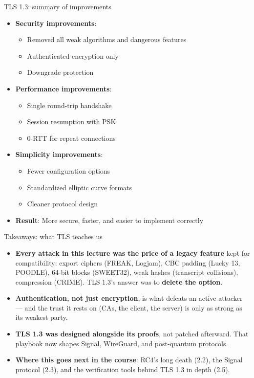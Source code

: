 \ifdefined\PRESENTATION\else\PassOptionsToClass{handout}{beamer}\fi\documentclass[aspectratio=169, lualatex]{beamer}
\begin{document}
\begin{frame}{TLS 1.3: summary of improvements}
	\begin{itemize}
		\item \textbf{Security improvements}:
		      \begin{itemize}
			      \item Removed all weak algorithms and dangerous features
			      \item Authenticated encryption only
			      \item Downgrade protection
		      \end{itemize}
		\item \textbf{Performance improvements}:
		      \begin{itemize}
			      \item Single round-trip handshake
			      \item Session resumption with PSK
			      \item 0-RTT for repeat connections
		      \end{itemize}
		\item \textbf{Simplicity improvements}:
		      \begin{itemize}
			      \item Fewer configuration options
			      \item Standardized elliptic curve formats
			      \item Cleaner protocol design
		      \end{itemize}
		\item \textbf{Result}: More secure, faster, and easier to implement correctly
	\end{itemize}
\end{frame}

\begin{frame}{Takeaways: what TLS teaches us}
	\begin{itemize}[<+->]
		\item \textbf{Every attack in this lecture was the price of a legacy feature} kept for compatibility: export ciphers (FREAK, Logjam), CBC padding (Lucky 13, POODLE), 64-bit blocks (SWEET32), weak hashes (transcript collisions), compression (CRIME). TLS 1.3's answer was to \textbf{delete the option}.
		\item \textbf{Authentication, not just encryption}, is what defeats an active attacker --- and the trust it rests on (CAs, the client, the server) is only as strong as its weakest party.
		\item \textbf{TLS 1.3 was designed alongside its proofs}, not patched afterward. That playbook now shapes Signal, WireGuard, and post-quantum protocols.
		\item \textbf{Where this goes next in the course}: RC4's long death (2.2), the Signal protocol (2.3), and the verification tools behind TLS 1.3 in depth (2.5).
	\end{itemize}
\end{frame}

\begin{frame}[plain]
	\titlepage
\end{frame}
\end{document}
